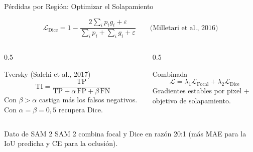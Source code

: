 \documentclass[aspectratio=169, 10pt]{beamer}
\newcommand{\formula}[1]{%
	\begin{tcolorbox}[colback=UCMBlue!8, colframe=UCMBlue, arc=4pt,
		boxsep=2pt, left=6pt, right=6pt, top=3pt, bottom=3pt]
		#1
	\end{tcolorbox}
}
\begin{document}
\begin{frame}{P\'erdidas por Regi\'on: Optimizar el Solapamiento}

	\formula{
		\[
		\mathcal{L}_{\text{Dice}} = 1 - \frac{2 \sum_i p_i g_i + \varepsilon}{\sum_i p_i + \sum_i g_i + \varepsilon}
		\qquad \text{(Milletari et al., 2016)}
		\]
	}

	\begin{columns}[T]
		\begin{column}{0.5\textwidth}
			\begin{block}{Tversky (Salehi et al., 2017)}
				\small
				\[
				\text{TI} = \frac{\text{TP}}{\text{TP} + \alpha\, \text{FP} + \beta\, \text{FN}}
				\]
				Con $\beta > \alpha$ castiga m\'as los falsos negativos. Con $\alpha = \beta = 0{,}5$ recupera Dice.
			\end{block}
		\end{column}

		\begin{column}{0.5\textwidth}
			\begin{block}{Combinada}
				\small
				\[
				\mathcal{L} = \lambda_1 \mathcal{L}_{\text{Focal}} + \lambda_2 \mathcal{L}_{\text{Dice}}
				\]
				Gradientes estables por pixel + objetivo de solapamiento.
			\end{block}
		\end{column}
	\end{columns}

	\vspace{0.2cm}

	\begin{alertblock}{Dato de SAM 2}
		SAM 2 combina focal y Dice en raz\'on 20:1 (m\'as MAE para la IoU predicha y CE para la oclusi\'on).
	\end{alertblock}

\end{frame}
\end{document}
